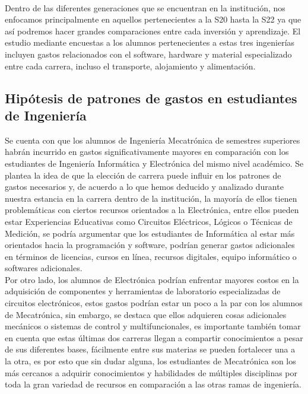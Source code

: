 \documentclass[letterpaper,12pt]{article}
\begin{document}
\begin{sloppypar}
\vspace{0.3cm}\\
Dentro de las diferentes generaciones que se encuentran en la institución, nos enfocamos principalmente en aquellos pertenecientes a la S20 hasta la S22 ya que así podremos hacer grandes comparaciones entre cada inversión y aprendizaje. El estudio mediante encuestas a los alumnos pertenecientes a estas tres ingenierías incluyen gastos relacionados con el software, hardware y material especializado entre cada carrera, incluso el transporte, alojamiento y alimentación.

\newpage
\begin{center}
    \section*{Hipótesis de patrones de gastos en estudiantes de Ingeniería}
\end{center}
Se cuenta con que los alumnos de Ingeniería Mecatrónica de semestres superiores habrán incurrido en gastos significativamente mayores en comparación con los estudiantes de Ingeniería Informática y Electrónica del mismo nivel académico. Se plantea la idea de que la elección de carrera puede influir en los patrones de gastos necesarios y, de acuerdo a lo que hemos deducido y analizado durante nuestra estancia en la carrera dentro de la institución, la mayoría de ellos tienen problemáticas con ciertos recursos orientados a la Electrónica, entre ellos pueden estar Experiencias Educativas como Circuitos Eléctricos, Lógicos o Técnicas de Medición, se podría argumentar que los estudiantes de Informática al estar más orientados hacia la programación y software, podrían generar gastos adicionales en términos de licencias, cursos en línea, recursos digitales, equipo informático o softwares adicionales.
\vspace{0.3cm}\\
Por otro lado, los alumnos de Electrónica podrían enfrentar mayores costos en la adquisición de componentes y herramientas de laboratorio especializadas de circuitos electrónicos, estos gastos podrían estar un poco a la par con los alumnos de Mecatrónica, sin embargo, se destaca que ellos adquieren cosas adicionales mecánicos o sistemas de control y multifuncionales, es importante también tomar en cuenta que estas últimas dos carreras llegan a compartir conocimientos a pesar de sus diferentes bases, fácilmente entre sus materias se pueden fortalecer una a la otra, es por esto que sin dudar alguna, los estudiantes de Mecatrónica son los más cercanos a adquirir conocimientos y habilidades de múltiples disciplinas por toda la gran variedad de recursos en comparación a las otras ramas de ingeniería.

\end{sloppypar}
\end{document}
